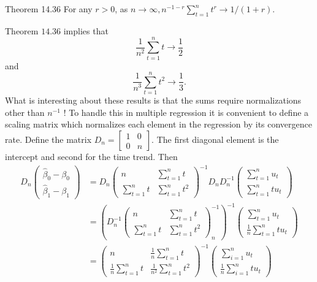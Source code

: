 \documentclass[10pt]{article}
\begin{document}
Theorem 14.36 For any $r>0$, as $n \rightarrow \infty, n^{-1-r} \sum_{t=1}^{n} t^{r} \longrightarrow 1 /(1+r)$.

Theorem $14.36$ implies that
$$
\frac{1}{n^{2}} \sum_{t=1}^{n} t \rightarrow \frac{1}{2}
$$
and
$$
\frac{1}{n^{3}} \sum_{t=1}^{n} t^{2} \rightarrow \frac{1}{3} .
$$
What is interesting about these results is that the sums require normalizations other than $n^{-1}$ ! To handle this in multiple regression it is convenient to define a scaling matrix which normalizes each element in the regression by its convergence rate. Define the matrix $D_{n}=\left[\begin{array}{ll}1 & 0 \\ 0 & n\end{array}\right]$. The first diagonal element is the intercept and second for the time trend. Then
$$
\begin{aligned}
D_{n}\left(\begin{array}{c}
\widehat{\beta}_{0}-\beta_{0} \\
\widehat{\beta}_{1}-\beta_{1}
\end{array}\right) &=D_{n}\left(\begin{array}{cc}
n & \sum_{t=1}^{n} t \\
\sum_{t=1}^{n} t & \sum_{t=1}^{n} t^{2}
\end{array}\right)^{-1} D_{n} D_{n}^{-1}\left(\begin{array}{c}
\sum_{t=1}^{n} u_{t} \\
\sum_{t=1}^{n} t u_{t}
\end{array}\right) \\
&=\left(D_{n}^{-1}\left(\begin{array}{cc}
n & \sum_{t=1}^{n} t \\
\sum_{t=1}^{n} t & \sum_{t=1}^{n} t^{2}
\end{array}\right)_{n}^{-1}\right)^{-1}\left(\begin{array}{c}
\sum_{t=1}^{n} u_{t} \\
\frac{1}{n} \sum_{t=1}^{n} t u_{t}
\end{array}\right) \\
&=\left(\begin{array}{cc}
n & \frac{1}{n} \sum_{t=1}^{n} t \\
\frac{1}{n} \sum_{t=1}^{n} t & \frac{1}{n^{2}} \sum_{t=1}^{n} t^{2}
\end{array}\right)^{-1}\left(\begin{array}{c}
\sum_{i=1}^{n} u_{t} \\
\frac{1}{n} \sum_{i=1}^{n} t u_{t}
\end{array}\right)
\end{aligned}
$$
\end{document}
